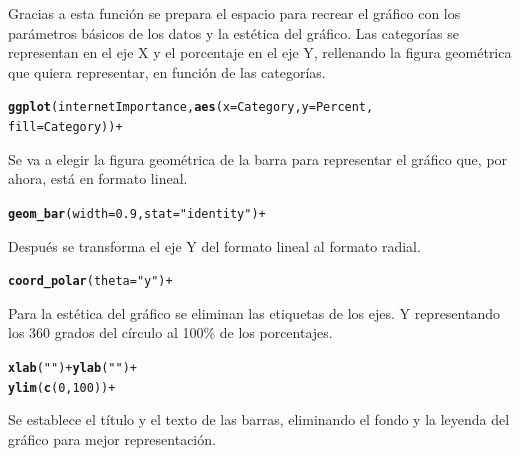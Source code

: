 \documentclass{article}\usepackage[]{graphicx}\usepackage[]{color}
\makeatletter
\newcommand{\hlstr}[1]{\textcolor[rgb]{0.192,0.494,0.8}{#1}}%
\newcommand{\hlkwd}[1]{\textcolor[rgb]{0.737,0.353,0.396}{\textbf{#1}}}%
\newenvironment{kframe}{%
 \def\at@end@of@kframe{}%
 \ifinner\ifhmode%
  \def\at@end@of@kframe{\end{minipage}}%
  \begin{minipage}{\columnwidth}%
 \fi\fi%
 \def\FrameCommand##1{\hskip\@totalleftmargin \hskip-\fboxsep
 \colorbox{shadecolor}{##1}\hskip-\fboxsep
     \hskip-\linewidth \hskip-\@totalleftmargin \hskip\columnwidth}%
 \MakeFramed {\advance\hsize-\width
   \@totalleftmargin\z@ \linewidth\hsize
   \@setminipage}}%
 {\par\unskip\endMakeFramed%
 \at@end@of@kframe}
\newenvironment{knitrout}{}{} %
\makeatother
\begin{document}
Gracias a esta funci\'on se prepara el espacio para recrear el gr\'afico con los par\'ametros b\'asicos de los datos y la est\'etica del gr\'afico. Las categor\'ias se representan en el eje X y el porcentaje en el eje Y, rellenando la figura geom\'etrica que quiera representar, en funci\'on de las categor\'ias.
\begin{knitrout}
\color{fgcolor}\begin{kframe}
\begin{alltt}
\hlkwd{ggplot}(internetImportance, \hlkwd{aes}(x = Category, y = Percent,
                               fill = Category)) +
\end{alltt}
\end{kframe}
\end{knitrout}
Se va a elegir la figura geom\'etrica de la barra para representar el gr\'afico que, por ahora, est\'a en formato lineal.
\begin{knitrout}
\color{fgcolor}\begin{kframe}
\begin{alltt}
  \hlkwd{geom_bar}(width = 0.9, stat=\hlstr{"identity"})  + 
\end{alltt}
\end{kframe}
\end{knitrout}
Despu\'es se transforma el eje Y del formato lineal al formato radial.
\begin{knitrout}
\color{fgcolor}\begin{kframe}
\begin{alltt}
  \hlkwd{coord_polar}(theta = \hlstr{"y"}) +
\end{alltt}
\end{kframe}
\end{knitrout}
\clearpage
Para la est\'etica del gr\'afico se eliminan las etiquetas de los ejes. Y representando los 360 grados del c\'irculo al 100\% de los porcentajes.
\begin{knitrout}
\color{fgcolor}\begin{kframe}
\begin{alltt}
  \hlkwd{xlab}(\hlstr{""}) + \hlkwd{ylab}(\hlstr{""}) +
  \hlkwd{ylim}(\hlkwd{c}(0,100)) +
\end{alltt}
\end{kframe}
\end{knitrout}
Se establece el t\'itulo y el texto de las barras, eliminando el fondo y la leyenda del gr\'afico para mejor representaci\'on.
\end{document}
